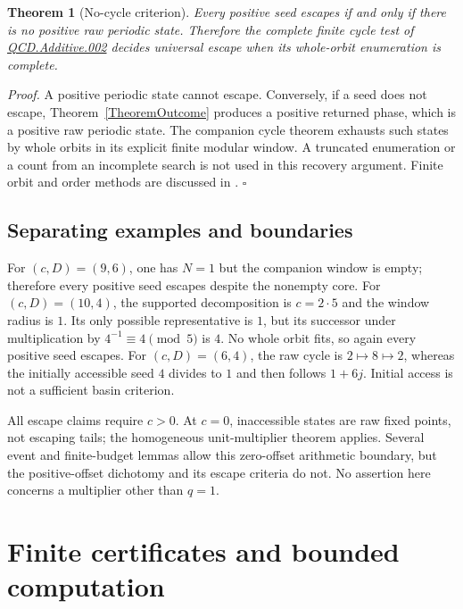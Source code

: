 \documentclass[11pt,letterpaper]{article}
\newtheorem{theorem}{Theorem}
\newenvironment{proof}{\noindent\textit{Proof.}}{\hfill\(\square\)}
\begin{document}
\begin{theorem}[No-cycle criterion]\label{TheoremNoCycle}
Every positive seed escapes if and only if there is no positive raw periodic
state. Therefore the complete finite cycle test of
\href{../../QCD.Additive.002/README.md}{QCD.Additive.002} decides universal
escape when its whole-orbit enumeration is complete.
\end{theorem}

\begin{proof}
A positive periodic state cannot escape. Conversely, if a seed does not
escape, Theorem~\ref{TheoremOutcome} produces a positive returned phase,
which is a positive raw periodic state. The companion cycle theorem
exhausts such states by whole orbits in its explicit finite modular window.
A truncated enumeration or a count from an incomplete search is not used
in this recovery argument. Finite orbit and order methods are discussed
in \cite{DummitFoote04}.
\end{proof}

\subsection*{Separating examples and boundaries}
For $(c,D)=(9,6)$, one has $N=1$ but the companion window is empty;
therefore every positive seed escapes despite the nonempty core.
For $(c,D)=(10,4)$, the supported decomposition is $c=2\cdot5$ and the
window radius is $1$. Its only possible representative is $1$, but its
successor under multiplication by $4^{-1}\equiv4\pmod5$ is $4$.
No whole orbit fits, so again every positive seed escapes.
For $(c,D)=(6,4)$, the raw cycle is $2\mapsto8\mapsto2$, whereas the initially
accessible seed $4$ divides to $1$ and then follows $1+6j$.
Initial access is not a sufficient basin criterion.

All escape claims require $c>0$. At $c=0$, inaccessible states are raw fixed
points, not escaping tails; the homogeneous unit-multiplier theorem applies.
Several event and finite-budget lemmas allow this zero-offset arithmetic
boundary, but the positive-offset dichotomy and its escape criteria do not.
No assertion here concerns a multiplier other than $q=1$.

\section{Finite certificates and bounded computation}
\end{document}

